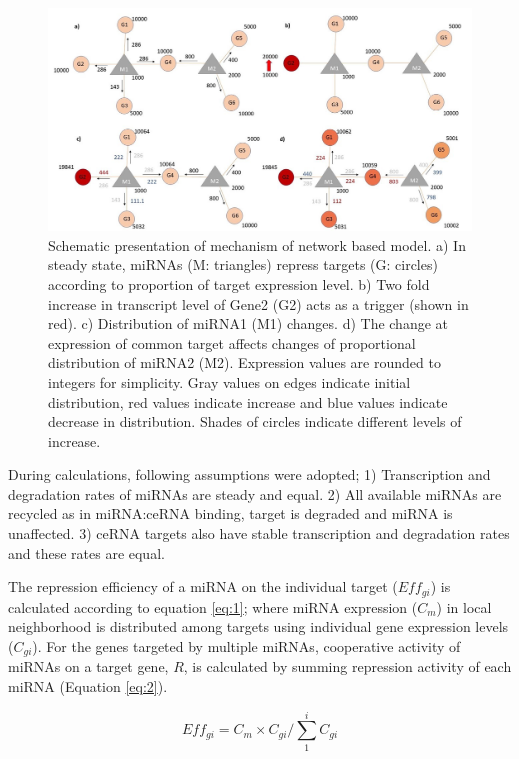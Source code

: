 \documentclass[]{article}
\begin{document}
\begin{figure}
\hypertarget{fig1}{%
\centering
\includegraphics{Fig1.jpg}
\caption{Schematic presentation of mechanism of network based model. a)
In steady state, miRNAs (M: triangles) repress targets (G: circles)
according to proportion of target expression level. b) Two fold increase
in transcript level of Gene2 (G2) acts as a trigger (shown in red). c)
Distribution of miRNA1 (M1) changes. d) The change at expression of
common target affects changes of proportional distribution of miRNA2
(M2). Expression values are rounded to integers for simplicity. Gray
values on edges indicate initial distribution, red values indicate
increase and blue values indicate decrease in distribution. Shades of
circles indicate different levels of increase.}\label{fig1}
}
\end{figure}

During calculations, following assumptions were adopted; 1)
Transcription and degradation rates of miRNAs are steady and equal. 2)
All available miRNAs are recycled as in miRNA:ceRNA binding, target is
degraded and miRNA is unaffected. 3) ceRNA targets also have stable
transcription and degradation rates and these rates are equal.

The repression efficiency of a miRNA on the individual target
(\(Eff_{gi}\)) is calculated according to equation \eqref{eq:1}; where
miRNA expression (\(C_m\)) in local neighborhood is distributed among
targets using individual gene expression levels (\(C_{gi}\)). For the
genes targeted by multiple miRNAs, cooperative activity of miRNAs on a
target gene, \(R\), is calculated by summing repression activity of each
miRNA (Equation \eqref{eq:2}).

\begin{equation} 
    Eff_{gi}= C_m \times C_{gi}/\sum_{1}^{i} C_{gi} \tag{1}\label{eq:1}
\end{equation}
\end{document}

